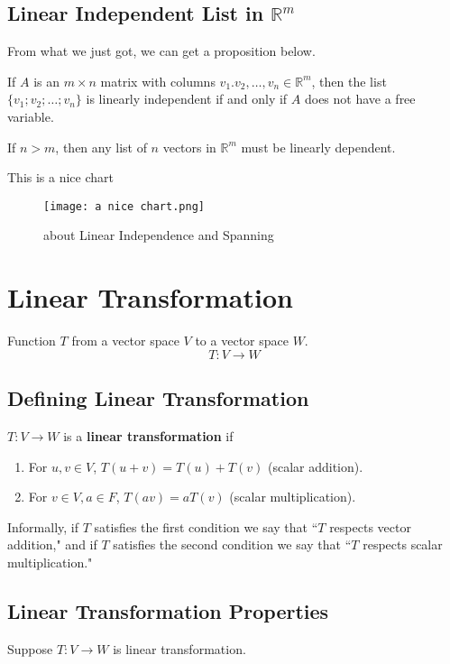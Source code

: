 \documentclass{package/notes}
\begin{document}
\subsection{Linear Independent List in $\mathbb{R}^m$}

From what we just got, we can get a proposition below.
\begin{proposition}

    If $A$ is an $m\times n$ matrix with columns $v_1.v_2,\dots , v_n \in \mathbb{R}^m$, then the list $\{v_1;v_2;\dots ; v_n\}$ is linearly independent if and only if $A$ does not have a free variable.

If $n>m$, then any list of $n$ vectors in $\mathbb{R}^m$ must be linearly dependent.
\end{proposition}
This is a nice chart
\begin{figure}[h]
    \centering
    \texttt{[image: a nice chart.png]}
    \caption{about Linear Independence and Spanning}
    \label{fig:my_label}
\end{figure}

\section{Linear Transformation}
Function $T$ from a vector space $V$ to a vector space $W$.
$$T: V\rightarrow W$$
\subsection{Defining Linear Transformation}

$T: V\rightarrow W$ is a \textbf{linear transformation} if 
\begin{enumerate}
    \item For $u,v\in V$, $T(u+v)=T(u)+T(v)$ (scalar addition).
    \item For $v\in V, a\in F$, $T(av)=aT(v)$ (scalar multiplication).
\end{enumerate}

Informally, if $T$ satisfies the first condition we say that “$T$ respects vector addition," and if $T$ satisfies the second condition we say that “$T$ respects scalar multiplication."

\subsection{Linear Transformation Properties}

Suppose $T: V\rightarrow W$ is linear transformation.
\end{document}
